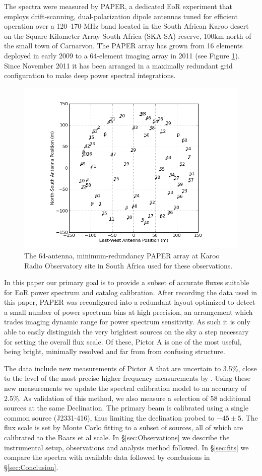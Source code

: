 \documentclass[preprint]{aastex}
\begin{document}
The spectra were measured by PAPER, a dedicated EoR experiment 
that employs drift-scanning, dual-polarization dipole antennas 
tuned for efficient operation over a 120--170-MHz band located in the South African Karoo desert
on the Square Kilometer Array
South Africa (SKA-SA) reserve, 100km north of the small town of Carnarvon.
The PAPER array has grown from 16 elements deployed in early 2009 to a
64-element imaging array in 2011 (see Figure \ref{fig:antpos}). Since November 2011 it has been arranged in a maximally redundant grid configuration to make deep power spectral integrations.  
\begin{figure}\centering
\includegraphics[width=0.85\columnwidth]{plots/antpos.png}
\caption{The 64-antenna, minimum-redundancy PAPER array at Karoo Radio Observatory site in South Africa used for these observations.
}\label{fig:antpos}
\end{figure}

In this paper our primary goal is to provide a subset of accurate fluxes
suitable for EoR power spectrum and catalog calibration.  After recording the
data used in this paper, PAPER was reconfigured into a redundant layout
optimized to detect a small number of power spectrum bins at high precision, an
arrangement which trades imaging dynamic range for power spectrum sensitivity.
As such it is only able to easily distinguish the very brightest sources on the
sky a step necessary for setting the overall flux scale. Of these, Pictor A is
one of the most useful, being bright, minimally resolved and far from from
confusing structure. 

The data  include new measurements of Pictor A that are uncertain to 3.5\%,
close to the level of the most precise higher frequency measurements by
\citet{Wills:1975p9314}. Using these new measurements we update the spectral
calibration model to an accuracy of 2.5\%. As validation of this method, we
also measure a selection of 58 additional sources at the same Declination.  The
primary beam is calibrated using a single common source (J2331-416), thus
limiting the declination probed to $-45 \pm 5$\arcdeg.  The flux scale is set
by Monte Carlo fitting to a subset of sources, all of which are calibrated to
the Baars et al scale. In \S\ref{sec:Observations} we describe the instrumental
setup, observations and analysis method followed. In \S\ref{sec:fits} we
compare the spectra with available data followed by conclusions in
\S\ref{sec:Conclusion}.
\end{document}
